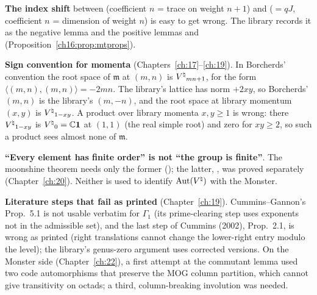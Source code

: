 \begin{warning}
\textbf{The index shift} between  (coefficient $n$ = trace on weight $n+1$) and 
($=qJ$, coefficient $n$ = dimension of weight $n$) is easy to get wrong.  The library records it as the negative lemma
 and the positive lemmas  and 
(Proposition~\ref{ch16:prop:mtprops}).
\end{warning}

\begin{warning}
\textbf{Sign convention for momenta} (Chapters~\ref{ch:17}--\ref{ch:19}).  In Borcherds'
convention the root space of $\mathfrak m$ at $(m,n)$ is ${V^{\natural}}_{mn+1}$, for the form $\langle(m,n),(m,n)\rangle=-2mn$.
The library's lattice  has norm $+2xy$, so Borcherds' $(m,n)$ is the library's $(m,-n)$, and
the root space at library momentum $(x,y)$ is ${V^{\natural}}_{1-xy}$.  A product over library momenta $x,y\ge1$ is wrong: there
${V^{\natural}}_{1-xy}$ is ${V^{\natural}}_0={\mathbb{C}}\mathbf 1$ at $(1,1)$ (the real simple root) and zero for $xy\ge2$, so such a product sees
almost none of $\mathfrak m$.
\end{warning}

\begin{warning}
\textbf{``Every element has finite order'' is not ``the group is finite''}.  The
moonshine theorem needs only the former (); the latter, , was proved
separately (Chapter~\ref{ch:20}).  Neither is used to identify $\operatorname{Aut}({V^{\natural}})$ with the Monster.
\end{warning}

\begin{warning}
\textbf{Literature steps that fail as printed} (Chapter~\ref{ch:19}).  Cummins--Gannon's
Prop.~5.1 is not usable verbatim for $\Gamma_1$ (its prime-clearing step uses exponents not in the admissible set), and
the last step of Cummins (2002), Prop.~2.1, is wrong as printed (right translations cannot change the lower-right entry
modulo the level); the library's genus-zero argument uses corrected versions.  On the Monster side
(Chapter~\ref{ch:22}), a first attempt at the commutant lemma used two code automorphisms that preserve the MOG column
partition, which cannot give transitivity on octads; a third, column-breaking involution was needed.
\end{warning}

